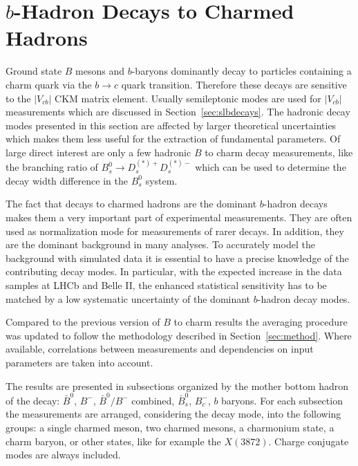 \section{$b$-Hadron Decays to Charmed Hadrons}
\label{sec:b2c}
Ground state $B$ mesons and $b$-baryons dominantly decay to particles containing a charm quark via the $b \rightarrow c$ quark transition.
Therefore these decays are sensitive to the $|V_{cb}|$ CKM matrix element.
Usually semileptonic modes are used for $|V_{cb}|$ measurements which are discussed in Section~\ref{sec:slbdecays}.
The hadronic decay modes presented in this section are affected by larger theoretical uncertainties which makes them less useful for the extraction of fundamental parameters.
Of large direct interest are only a few hadronic $B$ to charm decay measurements, like the branching ratio of $B_s^0 \rightarrow D_s^{(*)+} D_s^{(*)-}$ which can be used to determine the decay width difference in the $B_s^0$ system.

The fact that decays to charmed hadrons are the dominant $b$-hadron decays makes them a very important part of experimental measurements.
They are often used as normalization mode for measurements of rarer decays.
In addition, they are the dominant background in many analyses.
To accurately model the background with simulated data it is essential to have a precise knowledge of the contributing decay modes.
In particular, with the expected increase in the data samples at LHCb and Belle II, the enhanced statistical sensitivity has to be matched by a low systematic uncertainty of the dominant $b$-hadron decay modes.

Compared to the previous version of $B$ to charm results the averaging procedure was updated to follow the methodology described in Section~\ref{sec:method}.
Where available, correlations between measurements and dependencies on input parameters are taken into account.

The results are presented in subsections organized by the mother bottom hadron of the decay: $\bar{B}^0$, $B^-$, $\bar{B}^0/B^-$ combined, $\bar{B}_s^0$, $B_c^-$, $b$ baryons.
For each subsection the measurements are arranged, considering the decay mode, into the following groups: a single charmed meson, two charmed mesons, a charmonium state, a charm baryon, or other states, like for example the $X(3872)$.
Charge conjugate modes are always included.

\clearpage

\newcommand{\btocharmplot}[1]{\begin{center}\texttt{[image: \#1]}\end{center}}
\newenvironment{btocharmtab}[1]{\begin{table}[H]\begin{center}\caption{#1}\begin{tabular}{| l l l |}}{\end{tabular}\end{center}\end{table}}
\newcommand{\btocharm}[1]{\btocharmplot{b2charm/#1}}

